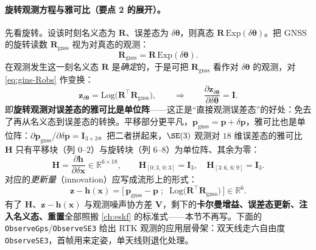 \paragraph{旋转观测方程与雅可比（要点 2 的展开）。}
先看旋转。设该时刻名义态为 $\mathbf{R}$、误差态为 $\delta\boldsymbol{\theta}$，则真态 $\mathbf{R}\,\mathrm{Exp}(\delta\boldsymbol{\theta})$。把 GNSS 的旋转读数 $\mathbf{R}_{\text{gnss}}$ 视为对真态的观测：
\begin{equation}
\label{eq:gins-Robs}
\mathbf{R}_{\text{gnss}} = \mathbf{R}\,\mathrm{Exp}(\delta\boldsymbol{\theta}).
\end{equation}
在观测发生这一刻名义态 $\mathbf{R}$ 是\emph{确定}的，于是可把 $\mathbf{R}_{\text{gnss}}$ 看作对 $\delta\boldsymbol{\theta}$ 的观测，对 \cref{eq:gins-Robs} 作变换：
\begin{equation}
\label{eq:gins-ztheta}
\mathbf{z}_{\delta\boldsymbol{\theta}} = \mathrm{Log}\big(\mathbf{R}^\top\mathbf{R}_{\text{gnss}}\big),
\qquad\Longrightarrow\qquad
\frac{\partial\mathbf{z}_{\delta\boldsymbol{\theta}}}{\partial\delta\boldsymbol{\theta}} = \mathbf{I}.
\end{equation}
即\textbf{旋转观测对误差态的雅可比是单位阵}——这正是“直接观测误差态”的好处：免去了再从名义态到误差态的转换。平移部分更平凡，$\mathbf{p}_{\text{gnss}}=\mathbf{p}+\delta\mathbf{p}$，雅可比也是单位阵：$\partial\mathbf{p}_{\text{gnss}}/\partial\delta\mathbf{p}=\mathbf{I}_{3\times3}$。把二者拼起来，$\SE(3)$ 观测对 $18$ 维误差态的雅可比 $\mathbf{H}$ 只有平移块（列 $0$–$2$）与旋转块（列 $6$–$8$）为单位阵、其余为零：
\begin{equation}
\label{eq:gins-H}
\mathbf{H}=\frac{\partial\mathbf{h}}{\partial\delta\mathbf{x}}\in\mathbb{R}^{6\times18},\qquad
\mathbf{H}_{[0:3,\,0:3]}=\mathbf{I}_3,\quad \mathbf{H}_{[3:6,\,6:9]}=\mathbf{I}_3.
\end{equation}
对应的\emph{更新量}（innovation）应写成流形上的形式\cite{gao2023slamad}：
\begin{equation}
\label{eq:gins-innov}
\mathbf{z}-\mathbf{h}(\mathbf{x}) =
\Big[\,\mathbf{p}_{\text{gnss}}-\mathbf{p}\;;\;\;\mathrm{Log}\big(\mathbf{R}^\top\mathbf{R}_{\text{gnss}}\big)\,\Big]\in\mathbb{R}^6.
\end{equation}
有了 $\mathbf{H}$、$\mathbf{z}-\mathbf{h}(\mathbf{x})$ 与观测噪声协方差 $\mathbf{V}$，剩下的\textbf{卡尔曼增益、误差态更新、注入名义态、重置}全部照搬 \cref{ch:eskf} 的标准式——本节不再写。下面的 \texttt{ObserveGps}/\texttt{ObserveSE3} 给出 RTK 观测的应用层骨架：双天线走六自由度 \texttt{ObserveSE3}，首帧用来定姿，单天线则退化处理。

